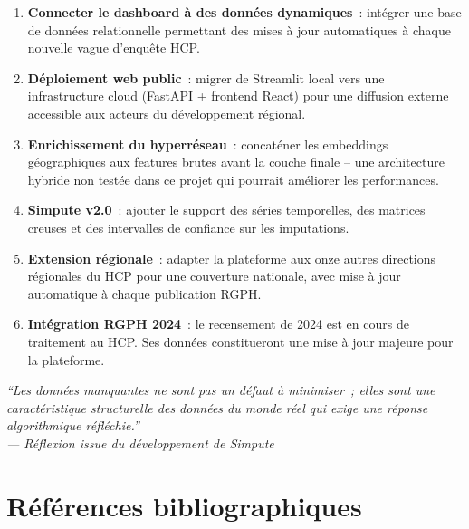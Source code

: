 \documentclass[12pt,a4paper]{report}
\begin{document}
\begin{enumerate}
  \item \textbf{Connecter le dashboard à des données dynamiques}~: intégrer une base de données relationnelle permettant des mises à jour automatiques à chaque nouvelle vague d'enquête HCP.
  \item \textbf{Déploiement web public}~: migrer de Streamlit local vers une infrastructure cloud (FastAPI + frontend React) pour une diffusion externe accessible aux acteurs du développement régional.
  \item \textbf{Enrichissement du hyperréseau}~: concaténer les embeddings géographiques aux features brutes avant la couche finale -- une architecture hybride non testée dans ce projet qui pourrait améliorer les performances.
  \item \textbf{Simpute v2.0}~: ajouter le support des séries temporelles, des matrices creuses et des intervalles de confiance sur les imputations.
  \item \textbf{Extension régionale}~: adapter la plateforme aux onze autres directions régionales du HCP pour une couverture nationale, avec mise à jour automatique à chaque publication RGPH.
  \item \textbf{Intégration RGPH 2024}~: le recensement de 2024 est en cours de traitement au HCP. Ses données constitueront une mise à jour majeure pour la plateforme.
\end{enumerate}

\vspace{1cm}
\begin{flushright}
\begin{minipage}{0.6\textwidth}
\itshape ``Les données manquantes ne sont pas un défaut à minimiser~; elles sont une caractéristique structurelle des données du monde réel qui exige une réponse algorithmique réfléchie.''\\[6pt]
{\normalsize\upshape --- Réflexion issue du développement de Simpute}
\end{minipage}
\end{flushright}

\newpage
\chapter*{Références bibliographiques}
\end{document}
